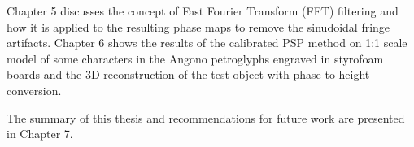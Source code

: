Chapter 5 discusses the concept of Fast Fourier Transform (FFT) filtering and how it is applied to the resulting phase maps to remove the sinudoidal fringe artifacts.
Chapter 6 shows the results of the calibrated PSP method on 1:1 scale model of some characters in the Angono petroglyphs engraved in styrofoam boards and the 3D reconstruction of the test object with phase-to-height conversion. 

The summary of this thesis and recommendations for future work are presented in Chapter 7.

